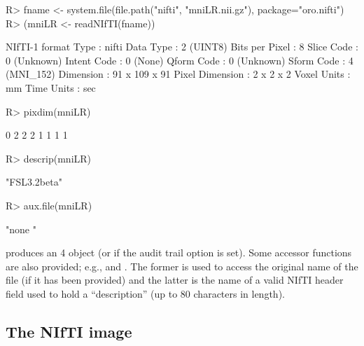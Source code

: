 \documentclass[
]{jss}
\begin{document}
\begin{CodeChunk}

\begin{CodeInput}
R> fname <- system.file(file.path("nifti", "mniLR.nii.gz"), package="oro.nifti")
R> (mniLR <- readNIfTI(fname))
\end{CodeInput}

\begin{CodeOutput}
NIfTI-1 format
  Type            : nifti
  Data Type       : 2 (UINT8)
  Bits per Pixel  : 8
  Slice Code      : 0 (Unknown)
  Intent Code     : 0 (None)
  Qform Code      : 0 (Unknown)
  Sform Code      : 4 (MNI_152)
  Dimension       : 91 x 109 x 91
  Pixel Dimension : 2 x 2 x 2
  Voxel Units     : mm
  Time Units      : sec
\end{CodeOutput}

\begin{CodeInput}
R> pixdim(mniLR)
\end{CodeInput}

\begin{CodeOutput}
[1] 0 2 2 2 1 1 1 1
\end{CodeOutput}

\begin{CodeInput}
R> descrip(mniLR)
\end{CodeInput}

\begin{CodeOutput}
[1] "FSL3.2beta"
\end{CodeOutput}

\begin{CodeInput}
R> aux.file(mniLR)
\end{CodeInput}

\begin{CodeOutput}
[1] "none                   "
\end{CodeOutput}
\end{CodeChunk}

produces an 4  object (or
 if the audit trail option is set). Some
accessor functions are also provided; e.g.,  and
. The former is used to access the original name of the
file (if it has been provided) and the latter is the name of a valid
NIfTI header field used to hold a ``description'' (up to 80 characters
in length).

\subsection{The NIfTI image}
\end{document}
